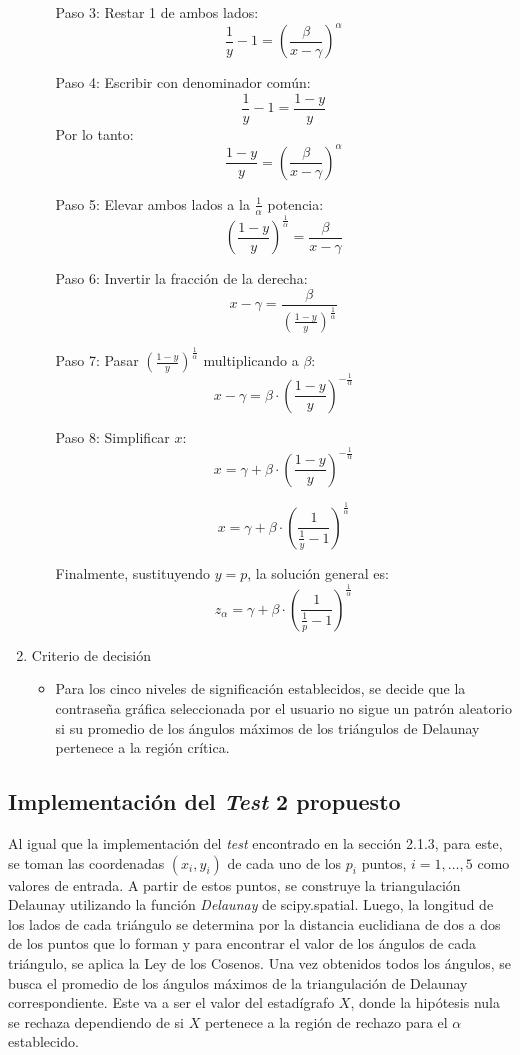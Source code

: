 \documentclass[12pt]{report}
\begin{document}
\begin{enumerate}
\begin{itemize}
		Paso 3: Restar 1 de ambos lados:
		\[
		\frac{1}{y} - 1 = \left( \frac{\beta}{x - \gamma} \right)^\alpha
		\]
		
		Paso 4: Escribir con denominador común:
		\[
		\frac{1}{y} - 1 = \frac{1 - y}{y}
		\]
		Por lo tanto:
		\[
		\frac{1 - y}{y} = \left( \frac{\beta}{x - \gamma} \right)^\alpha
		\]
		
		Paso 5: Elevar ambos lados a la \( \frac{1}{\alpha} \) potencia:
		\[
		\left( \frac{1 - y}{y} \right)^{\frac{1}{\alpha}} = \frac{\beta}{x - \gamma}
		\]
		
		Paso 6: Invertir la fracción de la derecha:
		\[
		x - \gamma = \frac{\beta}{\left( \frac{1 - y}{y} \right)^{\frac{1}{\alpha}}}
		\]
				
		Paso 7: Pasar \( \left( \frac{1 - y}{y} \right)^{\frac{1}{\alpha}} \) multiplicando a \( \beta \):
		\[
		x - \gamma = \beta \cdot \left( \frac{1 - y}{y} \right)^{-\frac{1}{\alpha}}
		\]
		
		Paso 8: Simplificar \( x \):
		\[
		x = \gamma + \beta \cdot \left( \frac{1 - y}{y} \right)^{-\frac{1}{\alpha}}
		\]
		
		\[
		x = \gamma + \beta \cdot \left( \frac{1}{\frac{1}{y}-1} \right)^{\frac{1}{\alpha}}
		\]
		
		Finalmente, sustituyendo \( y = p \), la solución general es:
		\[
		 z_\alpha = \gamma + \beta \cdot \left( \frac{1}{\frac{1}{p}-1} \right)^{\frac{1}{\alpha}}
		\]
		
		
	\end{itemize}
	\item Criterio de decisión
	\begin{itemize}
		\item Para los cinco niveles de significación establecidos, se decide que la contraseña gráfica seleccionada por el usuario no sigue un patrón aleatorio si su promedio de los ángulos máximos de los triángulos de Delaunay  pertenece a la región crítica. 
	\end{itemize}
\end{enumerate}
\subsection{Implementación del \textit{Test} 2 propuesto }
\label{sec:2.3}

Al igual que  la implementación del \textit{test} encontrado en la sección 2.1.3, para este, se toman las coordenadas \((x_i, y_i)\) de cada uno de los \(p_i\) puntos, \(i = 1, \ldots, 5\) como valores de entrada. A partir de estos puntos, se construye la triangulación Delaunay utilizando la función \textit{Delaunay} de scipy.spatial.
Luego, la longitud de los lados de cada triángulo se determina por la distancia euclidiana de dos a dos de los puntos que lo forman y para encontrar el valor de los ángulos de cada triángulo, se aplica la Ley de los Cosenos. Una vez obtenidos todos los ángulos, se busca el promedio de los ángulos máximos  de la triangulación de Delaunay correspondiente.  Este va a ser el valor del estadígrafo \(X\), donde la hipótesis nula se rechaza dependiendo de si  \(X\) pertenece a la región de rechazo para el \(\alpha\) establecido. 
\end{document}

